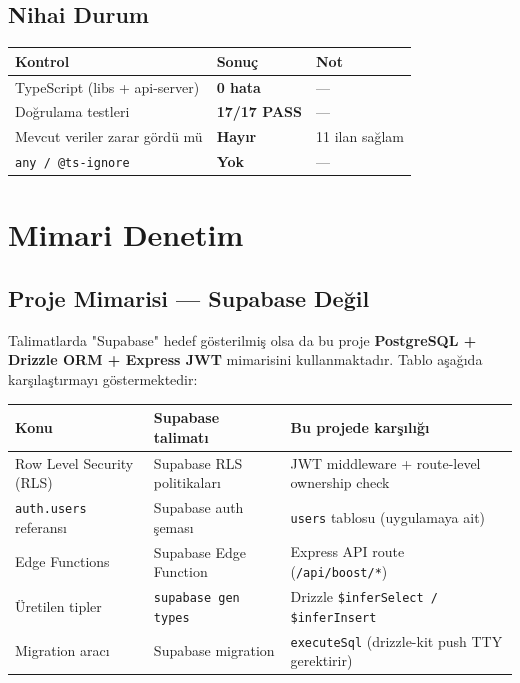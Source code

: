 \documentclass[12pt,a4paper]{article}
\begin{document}
\subsection{Nihai Durum}

\begin{center}
\begin{tabular}{lll}
  \toprule
  \textbf{Kontrol} & \textbf{Sonuç} & \textbf{Not}\\
  \midrule
  TypeScript (libs + api-server) & \textcolor{successgreen}{\bfseries 0 hata} & —\\
  Doğrulama testleri            & \textcolor{successgreen}{\bfseries 17/17 PASS} & —\\
  Mevcut veriler zarar gördü mü & \textcolor{successgreen}{\bfseries Hayır} & 11 ilan sağlam\\
  \texttt{any / @ts-ignore}     & \textcolor{successgreen}{\bfseries Yok} & —\\
  \bottomrule
\end{tabular}
\end{center}

\section{Mimari Denetim}

\subsection{Proje Mimarisi — Supabase Değil}

Talimatlarda "Supabase" hedef gösterilmiş olsa da bu proje
\textbf{PostgreSQL + Drizzle ORM + Express JWT} mimarisini kullanmaktadır.
Tablo aşağıda karşılaştırmayı göstermektedir:

\begin{center}
\begin{tabular}{p{5cm} p{4cm} p{4cm}}
  \toprule
  \textbf{Konu} & \textbf{Supabase talimatı} & \textbf{Bu projede karşılığı}\\
  \midrule
  Row Level Security (RLS) & Supabase RLS politikaları & JWT middleware + route-level ownership check\\
  \texttt{auth.users} referansı & Supabase auth şeması & \texttt{users} tablosu (uygulamaya ait)\\
  Edge Functions & Supabase Edge Function & Express API route (\texttt{/api/boost/*})\\
  Üretilen tipler & \texttt{supabase gen types} & Drizzle \texttt{\$inferSelect / \$inferInsert}\\
  Migration aracı & Supabase migration & \texttt{executeSql} (drizzle-kit push TTY gerektirir)\\
  \bottomrule
\end{tabular}
\end{center}
\end{document}
